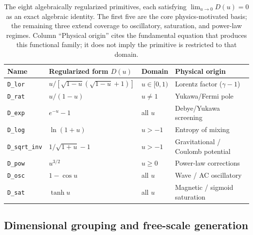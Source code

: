 \documentclass{article}
\begin{document}
\begin{table}[ht]
\small
\caption{The eight algebraically regularized primitives, each satisfying
$\lim_{u\to0}D(u)=0$ as an exact algebraic identity.
The first five are the core physics-motivated basis; the remaining three extend
coverage to oscillatory, saturation, and power-law regimes.
Column ``Physical origin'' cites the fundamental equation that produces this
functional family; it does not imply the primitive is restricted to that domain.}
\label{tab:primitives}
\centering
\begin{tabular}{@{}lllp{3.2cm}@{}}
\toprule
Name & Regularized form $D(u)$ & Domain & Physical origin \\
\midrule
\texttt{D\_lor}      & $u/[\sqrt{1-u}(\sqrt{1-u}+1)]$ & $u\in[0,1)$ & Lorentz factor ($\gamma-1$) \\
\texttt{D\_rat}      & $u/(1-u)$                       & $u\neq 1$   & Yukawa/Fermi pole \\
\texttt{D\_exp}      & $e^{-u}-1$                      & all $u$     & Debye/Yukawa screening \\
\texttt{D\_log}      & $\ln(1+u)$                      & $u>-1$      & Entropy of mixing \\
\texttt{D\_sqrt\_inv}& $1/\sqrt{1+u}-1$                & $u>-1$      & Gravitational / Coulomb potential \\
\texttt{D\_pow}      & $u^{3/2}$                       & $u\ge0$     & Power-law corrections \\
\texttt{D\_osc}      & $1-\cos u$                      & all $u$     & Wave / AC oscillatory \\
\texttt{D\_sat}      & $\tanh u$                       & all $u$     & Magnetic / sigmoid saturation \\
\bottomrule
\end{tabular}
\end{table}

\subsection{Dimensional grouping and free-scale generation}
\label{sec:buckingham}
\end{document}
